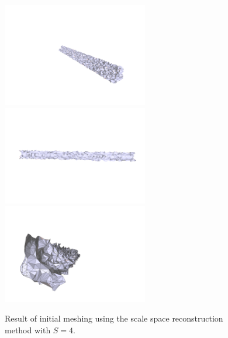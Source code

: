 \documentclass[12pt]{drexelthesis}
\begin{document}
\begin{figure}[!ht]
	
	\centering
		\includegraphics[trim={4.5in 2in 1.5in 3in},clip,width=2.5in]{simulated-lab-scan/2cmnoise/2cmmesh/scalespace400.png}
		\includegraphics[width=2.5in]{simulated-lab-scan/2cmnoise/2cmmesh/scalespace401.png}
		\includegraphics[width=2.5in]{simulated-lab-scan/2cmnoise/2cmmesh/scalespace402.png}
		\caption[Initial meshing using a scale space reconstruction with $S = 4$]{\centering  Result of initial meshing using the scale space reconstruction method with $S = 4$.}
		\label{2cmnoise:scalespace4}
\end{figure}
\end{document}
